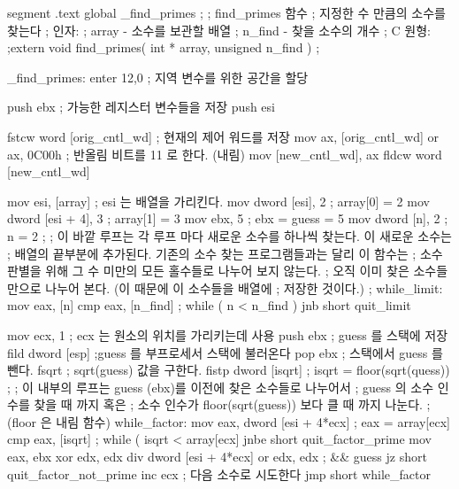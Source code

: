 \begin{AsmCodeListing}[label=prime2.asm]
segment .text
        global  _find_primes
;
; find_primes 함수
; 지정한 수 만큼의 소수를 찾는다 
; 인자:
;   array  - 소수를 보관할 배열
;   n_find - 찾을 소수의 개수
; C 원형:
;extern void find_primes( int * array, unsigned n_find )
;

_find_primes:
        enter   12,0                    ; 지역 변수를 위한 공간을 할당 

        push    ebx                     ; 가능한 레지스터 변수들을 저장 
        push    esi

        fstcw   word [orig_cntl_wd]     ; 현재의 제어 워드를 저장 
        mov     ax, [orig_cntl_wd]
        or      ax, 0C00h               ; 반올림 비트를 11 로 한다. (내림)
        mov     [new_cntl_wd], ax
        fldcw   word [new_cntl_wd]

        mov     esi, [array]            ; esi 는 배열을 가리킨다. 
        mov     dword [esi], 2          ; array[0] = 2
        mov     dword [esi + 4], 3      ; array[1] = 3
        mov     ebx, 5                  ; ebx = guess = 5
        mov     dword [n], 2            ; n = 2
;
; 이 바깥 루프는 각 루프 마다 새로운 소수를 하나씩 찾는다. 이 새로운 소수는
; 배열의 끝부분에 추가된다. 기존의 소수 찾는 프로그램들과는 달리 이 함수는 
; 소수 판별을 위해 그 수 미만의 모든 홀수들로 나누어 보지 않는다.
; 오직 이미 찾은 소수들 만으로 나누어 본다. (이 때문에 이 소수들을 배열에
; 저장한 것이다.)
;
while_limit:
        mov     eax, [n]
        cmp     eax, [n_find]           ; while ( n < n_find )
        jnb     short quit_limit

        mov     ecx, 1                  ; ecx 는 원소의 위치를 가리키는데 사용 
        push    ebx                     ; guess 를 스택에 저장 
        fild    dword [esp]             ;guess 를 부프로세서 스택에 불러온다
        pop     ebx                     ; 스택에서 guess 를 뺀다.
        fsqrt                           ; sqrt(guess) 값을 구한다. 
        fistp   dword [isqrt]           ; isqrt = floor(sqrt(quess))
;
; 이 내부의 루프는 guess (ebx)를 이전에 찾은 소수들로 나누어서
; guess 의 소수 인수를 찾을 때 까지 혹은  
; 소수 인수가 floor(sqrt(guess)) 보다 클 때 까지 나눈다. 
;(floor 은 내림 함수)
while_factor:
        mov     eax, dword [esi + 4*ecx]        ; eax = array[ecx]
        cmp     eax, [isqrt]                    ; while ( isqrt < array[ecx] 
        jnbe    short quit_factor_prime
        mov     eax, ebx
        xor     edx, edx
        div     dword [esi + 4*ecx]     
        or      edx, edx                        ; && guess %
        jz      short quit_factor_not_prime
        inc     ecx                             ; 다음 소수로 시도한다 
        jmp     short while_factor


\end{AsmCodeListing}
